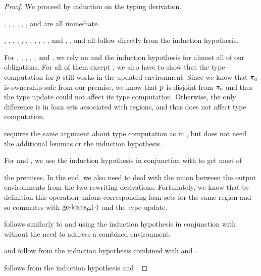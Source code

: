 \begin{proof}
  We proceed by induction on the typing derivation.

  , , , ,
  , , and  are all immediate.

  , , , ,
  , , , ,
  , , , and ,
  , and  all follow directly from the
  induction hypothesis.

  For , , ,
  , , and , we
  rely on  and the induction
  hypothesis for almost all of our obligations. For all of them except
  , we also have to show that the type computation for
  $p$ still works in the updated environment. Since we know that
  $\pi_a$ is ownership safe from our premise, we know that $p$
  is disjoint from $\pi_a$ and thus the type update could not affect its
  type computation. Otherwise, the only difference is in loan sets associated
  with regions, and thus does not affect type computation.

   requires the same argument about type computation as in
  , but does not need the additional lemmas or the induction
  hypothesis.

  For  and , we use the induction hypothesis in
  conjunction with  to get most of

  the premises. In the end, we also need to deal with the union between the
  output environments from the two rewriting derivations. Fortunately, we know
  that by definition this operation unions corresponding loan sets for the same
  region and so commutes with $\textrm{gc-loans}_{\Theta}(\cdot)$ and the type update.

   follows similarly to  and 
  using the induction hypothesis in conjunction with
   without the need to address a combined
  environment.

   and  follow from the induction
  hypothesis combined with  and
  .

   follows from the induction hypothesis and
  .
\end{proof}


